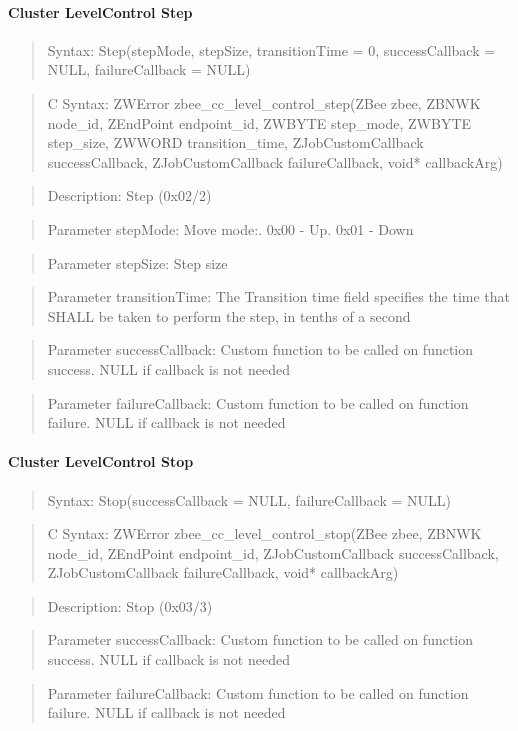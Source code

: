 \paragraph{Cluster LevelControl Step}
\begin{quote}Syntax: Step(stepMode, stepSize, transitionTime = 0, successCallback = NULL, failureCallback = NULL)\end{quote}
\begin{quote}C Syntax: ZWError zbee\_cc\_level\_control\_step(ZBee zbee, ZBNWK node\_id, ZEndPoint endpoint\_id, ZWBYTE step\_mode, ZWBYTE step\_size, ZWWORD transition\_time, ZJobCustomCallback successCallback, ZJobCustomCallback failureCallback, void* callbackArg)\end{quote}
\begin{quote}Description: Step (0x02/2)\end{quote}
\begin{quote}Parameter stepMode: Move mode:. 0x00 - Up. 0x01 - Down\end{quote}
\begin{quote}Parameter stepSize: Step size\end{quote}
\begin{quote}Parameter transitionTime: The Transition time field specifies the time that SHALL be taken to perform the step, in tenths of a second\end{quote}
\begin{quote}Parameter successCallback: Custom function to be called on function success. NULL if callback is not needed\end{quote}
\begin{quote}Parameter failureCallback: Custom function to be called on function failure. NULL if callback is not needed\end{quote}


\paragraph{Cluster LevelControl Stop}
\begin{quote}Syntax: Stop(successCallback = NULL, failureCallback = NULL)\end{quote}
\begin{quote}C Syntax: ZWError zbee\_cc\_level\_control\_stop(ZBee zbee, ZBNWK node\_id, ZEndPoint endpoint\_id, ZJobCustomCallback successCallback, ZJobCustomCallback failureCallback, void* callbackArg)\end{quote}
\begin{quote}Description: Stop (0x03/3)\end{quote}
\begin{quote}Parameter successCallback: Custom function to be called on function success. NULL if callback is not needed\end{quote}
\begin{quote}Parameter failureCallback: Custom function to be called on function failure. NULL if callback is not needed\end{quote}


